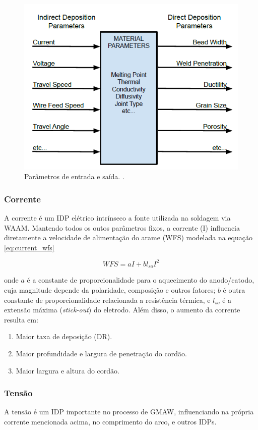 \begin{figure}[hbt!]
    \centering
    \includegraphics[width=0.8\linewidth]{Imagens/chap02/waam_params.png}
    \caption{Parâmetros de entrada e saída. \cite{ozcelik2003modeling}.}
    \label{fig:waam_params}
\end{figure}

\subsubsection{Corrente}
A corrente é um IDP elétrico intrínseco a fonte utilizada na soldagem via WAAM. Mantendo todos os outos parâmetros fixos, a corrente (I) influencia diretamente a velocidade de alimentação do arame (WFS) modelada na equação \ref{eq:current_wfs}

\begin{equation}
WFS = aI + bl_{so}I^2
\label{eq:current_wfs}
\end{equation}

onde $a$ é a constante de proporcionalidade para o aquecimento do anodo/catodo, cuja magnitude depende da polaridade, composição e outros fatores; $b$ é outra constante de proporcionalidade relacionada a resistência térmica, e $l_{so}$ é a extensão máxima (\textit{stick-out}) do eletrodo. Além disso, o aumento da corrente resulta em:

\begin{enumerate}
    \item Maior taxa de deposição (DR).
    \item Maior profundidade e largura de penetração do cordão.
    \item Maior largura e altura do cordão.
\end{enumerate}

\subsubsection{Tensão}
A tensão é um IDP importante no processo de GMAW, influenciando na própria corrente mencionada acima, no comprimento do arco, e outros IDPs.

